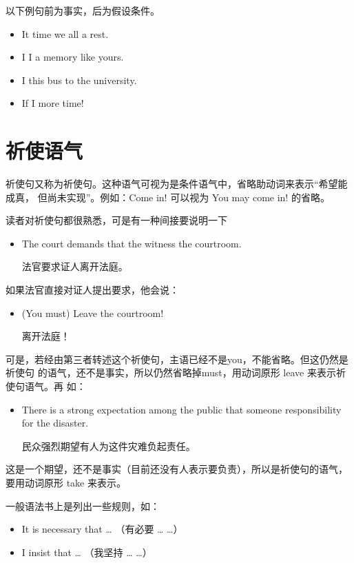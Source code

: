  以下例句前为事实，后为假设条件。
\begin{itemize}
\item It time we all  a rest.

\item I  I  a memory like yours.

\item I  this bus  to the university.

\item  If  I  more time!
\end{itemize}

\section{祈使语气}

祈使句又称为祈使句。这种语气可视为是条件语气中，省略助动词来表示“希望能成真，
但尚未实现”。例如：Come in! 可以视为 You may come in! 的省略。

读者对祈使句都很熟悉，可是有一种间接要说明一下
\begin{itemize}
\item The court demands that the witness  the courtroom.

  法官要求证人离开法庭。
\end{itemize}

如果法官直接对证人提出要求，他会说：
\begin{itemize}
\item  (You must) Leave the courtroom!

  离开法庭！
\end{itemize}
可是，若经由第三者转述这个祈使句，主语已经不是you，不能省略。但这仍然是祈使句
的语气，还不是事实，所以仍然省略掉must，用动词原形 leave 来表示祈使句语气。再
如：
\begin{itemize}
\item There is a strong expectation among the public that someone 
  responsibility for the disaster.

  民众强烈期望有人为这件灾难负起责任。
\end{itemize}
这是一个期望，还不是事实（目前还没有人表示要负责），所以是祈使句的语气，要用动词原形
take 来表示。

一般语法书上是列出一些规则，如：
\begin{itemize}
\item  It is necessary that \ldots{} （有必要 \ldots{} \ldots）
\item  I insist that \ldots{} （我坚持 \ldots{} \ldots）
\end{itemize}

